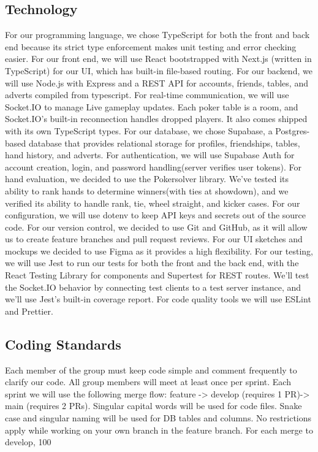 \documentclass{article}
\begin{document}
\subsection{Technology}
For our programming language, we chose TypeScript for both the front and back end because its strict type enforcement makes unit testing and error checking easier. For our front end, we will use React bootstrapped with Next.js (written in TypeScript) for our UI, which has built-in file-based routing. For our backend, we will use Node.js with Express and a REST API for accounts, friends, tables, and adverts compiled from typescript. 
For real-time communication, we will use Socket.IO to manage Live gameplay updates. Each poker table is a room, and Socket.IO’s built-in reconnection handles dropped players. It also comes shipped with its own TypeScript types. 
For our database, we chose Supabase, a Postgres-based database that provides relational storage for profiles, friendships, tables, hand history, and adverts. For authentication, we will use Supabase Auth for account creation, login, and password handling(server verifies user tokens).
For hand evaluation, we decided to use the Pokersolver library. We’ve tested its ability to rank hands to determine winners(with ties at showdown), and we verified its ability to handle rank, tie, wheel straight, and kicker cases.
For our configuration, we will use dotenv to keep API keys and secrets out of the source code. For our version control, we decided to use Git and GitHub, as it will allow us to create feature branches and pull request reviews.
For our UI sketches and mockups we decided to use Figma as it provides a high flexibility.
For our testing, we will use Jest to run our tests for both the front and the back end, with the React Testing Library for components and Supertest for REST routes. We’ll test the Socket.IO behavior by connecting test clients to a test server instance, and we’ll use Jest’s built-in coverage report. For code quality tools we will use ESLint and Prettier. 


\subsection{Coding Standards}
Each member of the group must keep code simple and comment frequently to clarify our code. All group members will meet at least once per sprint. Each sprint we will use the following merge flow: feature -> develop (requires 1 PR)-> main (requires 2 PRs). Singular capital words will be used for code files. Snake case and singular naming will be used for DB tables and columns.  No restrictions apply while working on your own branch in the feature branch.
For each merge to develop, 100%
\end{document}
